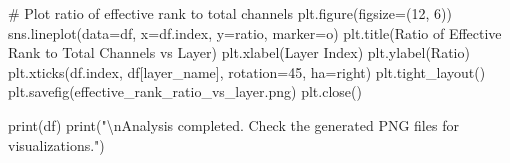 \documentclass[
  letterpaper,
  DIV=11,
  numbers=noendperiod]{scrreprt}
\newenvironment{Shaded}{\begin{snugshade}}{\end{snugshade}}
\newcommand{\BuiltInTok}[1]{\textcolor[rgb]{0.00,0.23,0.31}{#1}}
\newcommand{\CharTok}[1]{\textcolor[rgb]{0.13,0.47,0.30}{#1}}
\newcommand{\CommentTok}[1]{\textcolor[rgb]{0.37,0.37,0.37}{#1}}
\newcommand{\DecValTok}[1]{\textcolor[rgb]{0.68,0.00,0.00}{#1}}
\newcommand{\NormalTok}[1]{\textcolor[rgb]{0.00,0.23,0.31}{#1}}
\newcommand{\OperatorTok}[1]{\textcolor[rgb]{0.37,0.37,0.37}{#1}}
\newcommand{\StringTok}[1]{\textcolor[rgb]{0.13,0.47,0.30}{#1}}
\begin{document}
\begin{Shaded}
\begin{Highlighting}[]
\CommentTok{\# Plot ratio of effective rank to total channels}
\NormalTok{plt.figure(figsize}\OperatorTok{=}\NormalTok{(}\DecValTok{12}\NormalTok{, }\DecValTok{6}\NormalTok{))}
\NormalTok{sns.lineplot(data}\OperatorTok{=}\NormalTok{df, x}\OperatorTok{=}\NormalTok{df.index, y}\OperatorTok{=}\StringTok{\textquotesingle{}ratio\textquotesingle{}}\NormalTok{, marker}\OperatorTok{=}\StringTok{\textquotesingle{}o\textquotesingle{}}\NormalTok{)}
\NormalTok{plt.title(}\StringTok{\textquotesingle{}Ratio of Effective Rank to Total Channels vs Layer\textquotesingle{}}\NormalTok{)}
\NormalTok{plt.xlabel(}\StringTok{\textquotesingle{}Layer Index\textquotesingle{}}\NormalTok{)}
\NormalTok{plt.ylabel(}\StringTok{\textquotesingle{}Ratio\textquotesingle{}}\NormalTok{)}
\NormalTok{plt.xticks(df.index, df[}\StringTok{\textquotesingle{}layer\_name\textquotesingle{}}\NormalTok{], rotation}\OperatorTok{=}\DecValTok{45}\NormalTok{, ha}\OperatorTok{=}\StringTok{\textquotesingle{}right\textquotesingle{}}\NormalTok{)}
\NormalTok{plt.tight\_layout()}
\NormalTok{plt.savefig(}\StringTok{\textquotesingle{}effective\_rank\_ratio\_vs\_layer.png\textquotesingle{}}\NormalTok{)}
\NormalTok{plt.close()}

\BuiltInTok{print}\NormalTok{(df)}
\BuiltInTok{print}\NormalTok{(}\StringTok{"}\CharTok{\textbackslash{}n}\StringTok{Analysis completed. Check the generated PNG files for visualizations."}\NormalTok{)}
\end{Highlighting}
\end{Shaded}
\end{document}
